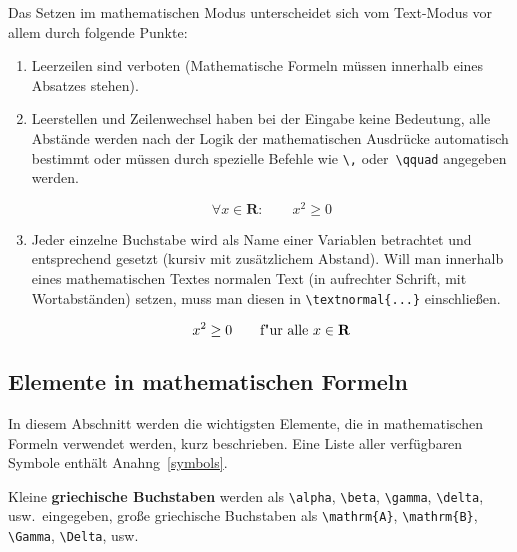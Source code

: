 Das Setzen im mathematischen Modus unterscheidet sich vom
Text-Modus vor allem durch folgende Punkte:
\begin{enumerate}
\item Leerzeilen sind verboten (Mathematische Formeln müssen
  innerhalb eines Absatzes stehen).

\item Leerstellen und Zeilenwechsel haben bei der Eingabe keine
  Bedeutung, alle Abstände werden nach der Logik der
  mathematischen Ausdrücke automatisch bestimmt oder müssen
  durch spezielle Befehle wie \lstinline|\,| oder~\lstinline|\qquad|
  angegeben werden.

\begin{LTXexample}
\begin{equation}
\forall x \in \mathbf{R}:
\qquad x^{2} \geq 0
\end{equation}
\end{LTXexample}

 
\item Jeder einzelne Buchstabe wird als Name einer Variablen
  betrachtet und entsprechend gesetzt (kursiv mit
  zusätzlichem Abstand).  Will man innerhalb eines
  mathematischen Textes normalen Text (in aufrechter Schrift, mit
  Wortabständen) setzen, muss man diesen in
  \lstinline|\textnormal{...}| einschließen.

\begin{LTXexample}
\begin{equation}
x^{2} \geq 0\qquad
\textnormal{f"ur alle }
x \in \mathbf{R}
\end{equation}
\end{LTXexample}

 
 
\end{enumerate}
 
\subsection{Elemente in mathematischen Formeln}
 
In diesem Abschnitt werden die wichtigsten Elemente, die in
mathematischen Formeln verwendet werden, kurz beschrieben.  Eine
Liste aller verfügbaren Symbole enthält
Anahng~\vref{symbols}.
 
\bigskip

Kleine \textbf{griechische Buchstaben} werden als \lstinline|\alpha|,
\lstinline|\beta|, \lstinline|\gamma|, \lstinline|\delta|, usw.\ eingegeben,
große griechische Buchstaben als \lstinline|\mathrm{A}|,
\lstinline|\mathrm{B}|, \lstinline|\Gamma|, \lstinline|\Delta|, usw.

